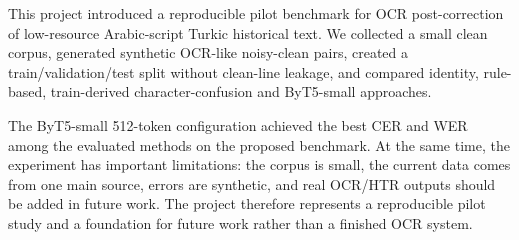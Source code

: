 \documentclass{article}
\begin{document}
This project introduced a reproducible pilot benchmark for OCR post-correction of low-resource Arabic-script Turkic historical text. We collected a small clean corpus, generated synthetic OCR-like noisy-clean pairs, created a train/validation/test split without clean-line leakage, and compared identity, rule-based, train-derived character-confusion and ByT5-small approaches.

The ByT5-small 512-token configuration achieved the best CER and WER among the evaluated methods on the proposed benchmark. At the same time, the experiment has important limitations: the corpus is small, the current data comes from one main source, errors are synthetic, and real OCR/HTR outputs should be added in future work. The project therefore represents a reproducible pilot study and a foundation for future work rather than a finished OCR system.



\end{document}
